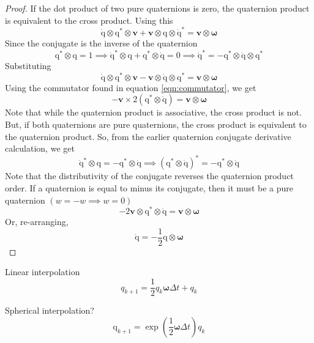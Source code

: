 \documentclass{amsart}
\theoremstyle{definition}
\theoremstyle{remark}
\numberwithin{equation}{section}
\begin{document}
\begin{proof}
	If the dot product of two pure quaternions is zero, the quaternion product is equivalent to the cross product.
	Using this
  \begin{equation}
    \mathrm{\dot{q}} \otimes \mathrm{q}^* \otimes \mathbf{v}
		+ \mathbf{v}\otimes\mathrm{q}\otimes\mathrm{\dot{q}^*}
		= \mathbf{v} \otimes \boldsymbol\omega
  \end{equation}
	Since the conjugate is the inverse of the quaternion
	\begin{equation}
		\mathrm{q^*}\otimes\mathrm{q} = 1 \implies \mathrm{\dot{q}^*} \otimes\mathrm{q}+\mathrm{q^*}\otimes\mathrm{\dot{q}} = 0 \implies \mathrm{\dot{q}^*} = -\mathrm{q^*}\otimes\mathrm{\dot{q}}\otimes\mathrm{q^*}
	\end{equation}
	Substituting
	\begin{equation}
    \mathrm{\dot{q}} \otimes \mathrm{q}^* \otimes \mathbf{v}
		- \mathbf{v}\otimes\mathrm{\dot{q}}\otimes\mathrm{q^*}
		= \mathbf{v} \otimes \boldsymbol\omega
	\end{equation}
  Using the commutator found in equation \ref{eqn:commutator}, we get
	\begin{equation}
		-\mathbf{v}\times2\left(\mathrm{q}^*\otimes\mathrm{\dot{q}}\right) = \mathbf{v}\otimes\boldsymbol\omega
	\end{equation}
	Note that while the quaternion product is associative, the cross product is not.
	But, if both quaternions are pure quaternions, the cross product is equivalent to the quaternion product.
	So, from the earlier quaternion conjugate derivative calculation, we get
	\begin{equation}
		\mathrm{\dot{q}^*}\otimes\mathrm{q} = - \mathrm{q^*} \otimes \mathrm{\dot{q}} \implies \left(\mathrm{q}^*\otimes\mathrm{\dot{q}}\right)^* = - \mathrm{q^*} \otimes \mathrm{\dot{q}}
	\end{equation}
	Note that the distributivity of the conjugate reverses the quaternion product order.
	If a quaternion is equal to minus its conjugate, then it must be a pure quaternion $(w=-w\implies w = 0)$
	\begin{equation}
		-2\mathbf{v}\otimes\mathrm{q^*}\otimes\mathrm{\dot{q}} = \mathbf{v}\otimes\boldsymbol\omega
	\end{equation}
	Or, re-arranging,
	\begin{equation}
		\mathrm{\dot{q}} = -\frac{1}{2} \mathrm{q}\otimes\boldsymbol\omega
	\end{equation}
  
\end{proof}

Linear interpolation
\begin{equation}
  q_{k+1} = \frac{1}{2}q_k\boldsymbol\omega\Delta t + q_k 
\end{equation}

Spherical interpolation?
\begin{equation}
  \mathrm{q}_{k+1} = \exp\left(\frac{1}{2} \boldsymbol\omega\Delta t\right)q_k
\end{equation}
\end{document}
